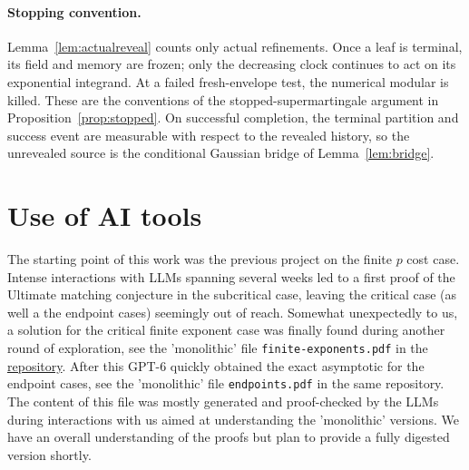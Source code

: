 \documentclass[11pt]{article}
\theoremstyle{definition}
\theoremstyle{remark}
\numberwithin{equation}{section}
\begin{document}
\paragraph{Stopping convention.}
Lemma~\ref{lem:actualreveal} counts only actual refinements.  Once a
leaf is terminal, its field and memory are frozen; only the decreasing
clock continues to act on its exponential integrand.  At a failed
fresh-envelope test, the numerical modular is killed.  These are the
conventions of the stopped-supermartingale argument in
Proposition~\ref{prop:stopped}.  On successful completion, the terminal
partition and success event are measurable with respect to the revealed
history, so the unrevealed source is the conditional Gaussian bridge of
Lemma~\ref{lem:bridge}.

\section*{Use of AI tools}
The starting point of this work was the previous project \cite{umc:AGGT26} on
  the finite $p$ cost case. Intense interactions with LLMs spanning several weeks
   led to a first proof of the Ultimate matching conjecture in the subcritical case,
    leaving the critical case (as well a the endpoint cases)
     seemingly out of reach. Somewhat unexpectedly to us, a solution for the critical
      finite exponent case was finally found during another round of exploration, see the 'monolithic' file \texttt{finite-exponents.pdf} in the
       \href{https://github.com/grottofrancesco/UltimateMatchingTheorem.git}{repository}.
  After this GPT-6 quickly obtained the exact asymptotic for the endpoint cases, see the 'monolithic' file \texttt{endpoints.pdf} in the same repository.
  The content of this file was mostly generated and proof-checked by the LLMs during interactions with us aimed at understanding the 'monolithic' versions.
  We have an overall understanding of the proofs but plan to provide a fully digested version shortly.
\end{document}
